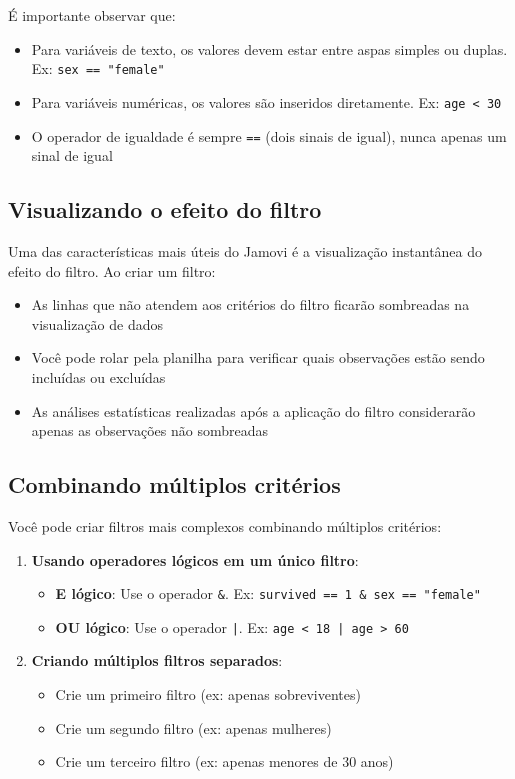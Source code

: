 É importante observar que:
\begin{itemize}
    \item Para variáveis de texto, os valores devem estar entre aspas simples ou duplas. Ex: \texttt{sex == "female"}
    \item Para variáveis numéricas, os valores são inseridos diretamente. Ex: \texttt{age < 30}
    \item O operador de igualdade é sempre \texttt{==} (dois sinais de igual), nunca apenas um sinal de igual
\end{itemize}

\subsection{Visualizando o efeito do filtro}

Uma das características mais úteis do Jamovi é a visualização instantânea do efeito do filtro. Ao criar um filtro:

\begin{itemize}
    \item As linhas que não atendem aos critérios do filtro ficarão sombreadas na visualização de dados
    \item Você pode rolar pela planilha para verificar quais observações estão sendo incluídas ou excluídas
    \item As análises estatísticas realizadas após a aplicação do filtro considerarão apenas as observações não sombreadas
\end{itemize}

\subsection{Combinando múltiplos critérios}

Você pode criar filtros mais complexos combinando múltiplos critérios:

\begin{enumerate}
    \item \textbf{Usando operadores lógicos em um único filtro}:
    \begin{itemize}
        \item \textbf{E lógico}: Use o operador \texttt{\&}. Ex: \texttt{survived == 1 \& sex == "female"}
        \item \textbf{OU lógico}: Use o operador \texttt{|}. Ex: \texttt{age < 18 | age > 60}
    \end{itemize}
    
    \item \textbf{Criando múltiplos filtros separados}:
    \begin{itemize}
        \item Crie um primeiro filtro (ex: apenas sobreviventes)
        \item Crie um segundo filtro (ex: apenas mulheres)
        \item Crie um terceiro filtro (ex: apenas menores de 30 anos)
    \end{itemize}
\end{enumerate}

